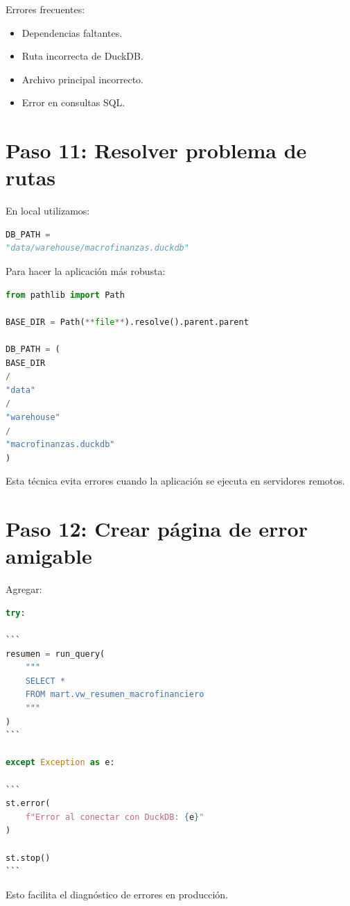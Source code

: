 Errores frecuentes:

\begin{itemize}
\item Dependencias faltantes.
\item Ruta incorrecta de DuckDB.
\item Archivo principal incorrecto.
\item Error en consultas SQL.
\end{itemize}

\section{Paso 11: Resolver problema de rutas}

En local utilizamos:

\begin{lstlisting}[language=Python]
DB_PATH =
"data/warehouse/macrofinanzas.duckdb"
\end{lstlisting}

Para hacer la aplicación más robusta:

\begin{lstlisting}[language=Python]
from pathlib import Path

BASE_DIR = Path(**file**).resolve().parent.parent

DB_PATH = (
BASE_DIR
/
"data"
/
"warehouse"
/
"macrofinanzas.duckdb"
)
\end{lstlisting}

Esta técnica evita errores cuando la aplicación se ejecuta en servidores remotos.

\section{Paso 12: Crear página de error amigable}

Agregar:

\begin{lstlisting}[language=Python]
try:

```
resumen = run_query(
    """
    SELECT *
    FROM mart.vw_resumen_macrofinanciero
    """
)
```

except Exception as e:

```
st.error(
    f"Error al conectar con DuckDB: {e}"
)

st.stop()
```

\end{lstlisting}

Esto facilita el diagnóstico de errores en producción.

